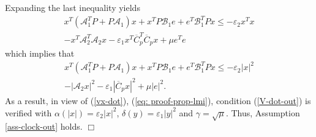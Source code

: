 \documentclass[a4paper, 9pt, twocolumn]{IEEEtran}
\theoremstyle{plain}
\theoremstyle{definition}
\begin{document}
Expanding the last inequality yields
\begin{equation}\label{eq: proof-prop-lmi}
\begin{array}{rrrrr}
  x^{T}(\mathcal{A}_{1}^{T}P + P\mathcal{A}_{1})x + x^{T}P\mathcal{B}_{1}e + e^{T}\mathcal{B}_{1}^{T}Px \leq -\varepsilon_{2} x^{T}x \\[2pt]
  - x^{T}\mathcal{A}_{2}^{T}\mathcal{A}_{2}x - \varepsilon_{1}x^{T}\overline{C}_{p}^{T}\overline{C}_{p}x + \mu e^{T}e
\end{array}
\end{equation}
which implies that
\begin{equation}\label{eq: proof-prop-lmi}
\begin{array}{rrrrr}
  x^{T}(\mathcal{A}_{1}^{T}P + P\mathcal{A}_{1})x + x^{T}P\mathcal{B}_{1}e + e^{T}\mathcal{B}_{1}^{T}Px \leq -\varepsilon_{2}|x|^{2} \\[2pt]
  - |\mathcal{A}_{2}x|^{2} - \varepsilon_{1}|\overline{C}_{p}x|^{2} + \mu|e|^{2}.
\end{array}
\end{equation}
As a result, in view of (\ref{vx-dot}), (\ref{eq: proof-prop-lmi}), condition (\ref{V-dot-out}) is verified with $\alpha(|x|)=\varepsilon_{2}|x|^{2}$, $\delta(y)=\varepsilon_{1}|y|^{2}$ and $\gamma = \sqrt{\mu}$. Thus, Assumption \ref{ass-clock-out} holds. \hfill $\Box$






\end{document}
